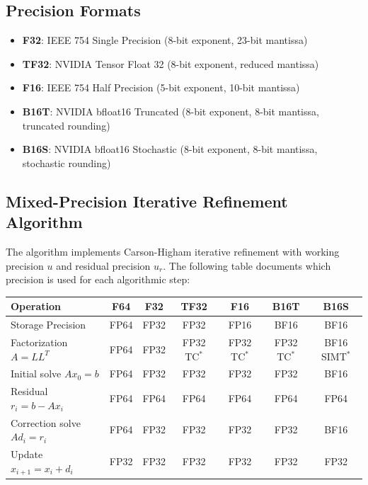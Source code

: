 \documentclass[11pt,a4paper]{article}
\begin{document}
\subsection{Precision Formats}
\begin{itemize}
  \item \textbf{F32}: IEEE 754 Single Precision (8-bit exponent, 23-bit mantissa)
  \item \textbf{TF32}: NVIDIA Tensor Float 32 (8-bit exponent, reduced mantissa)
  \item \textbf{F16}: IEEE 754 Half Precision (5-bit exponent, 10-bit mantissa)
  \item \textbf{B16T}: NVIDIA bfloat16 Truncated (8-bit exponent, 8-bit mantissa, truncated rounding)
  \item \textbf{B16S}: NVIDIA bfloat16 Stochastic (8-bit exponent, 8-bit mantissa, stochastic rounding)
\end{itemize}

\subsection{Mixed-Precision Iterative Refinement Algorithm}

The algorithm implements Carson-Higham iterative refinement with working precision $u$ and residual precision $u_r$. The following table documents which precision is used for each algorithmic step:

\begin{center}
\begin{tabular}{l|cccccc}
\toprule
\textbf{Operation} & \textbf{F64} & \textbf{F32} & \textbf{TF32} & \textbf{F16} & \textbf{B16T} & \textbf{B16S} \\
\midrule
Storage Precision & FP64 & FP32 & FP32 & FP16 & BF16 & BF16 \\
Factorization $A = LL^T$ & FP64 & FP32 & FP32 TC$^*$ & FP32 TC$^*$ & FP32 TC$^*$ & BF16 SIMT$^*$ \\
Initial solve $Ax_0 = b$ & FP64 & FP32 & FP32 & FP32 & FP32 & BF16 \\
Residual $r_i = b - Ax_i$ & FP64 & FP64 & FP64 & FP64 & FP64 & FP64 \\
Correction solve $Ad_i = r_i$ & FP64 & FP32 & FP32 & FP32 & FP32 & BF16 \\
Update $x_{i+1} = x_i + d_i$ & FP32 & FP32 & FP32 & FP32 & FP32 & FP32 \\
\bottomrule
\end{tabular}
\end{center}
\end{document}
